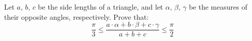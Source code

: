 Let $a$, $b$, $c$ be the side lengths of a triangle,
and let $\alpha$, $\beta$, $\gamma$ be the measures of their opposite angles, respectively.
Prove that:
\begin{equation*}
  \frac{\pi}{3}
  \le
  \frac{a \cdot \alpha + b \cdot \beta + c \cdot \gamma}{a + b + c}
  \le
  \frac{\pi}{2}
\end{equation*}
